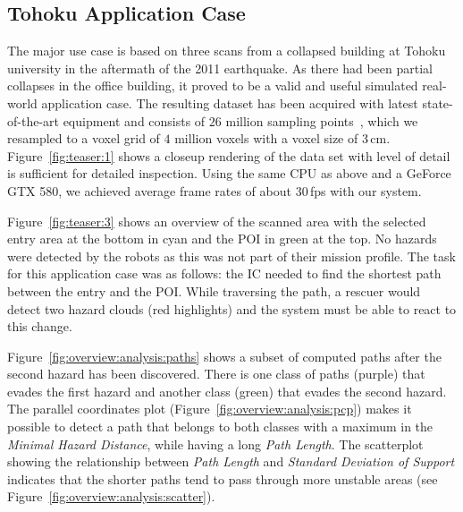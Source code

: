 \documentclass{egpubl}
\begin{document}
\subsection{Tohoku Application Case} \label{sec:results:applicationcase}

The major use case is based on three scans from a collapsed building at Tohoku university in the aftermath of the 2011 earthquake. As there had been partial collapses in the office building, it proved to be a valid and useful simulated real-world application case. The resulting dataset has been acquired with latest state-of-the-art equipment and consists of $26$ million sampling points~\cite{journals/jfr/NagataniKOOYTNYKFK13}, which we resampled to a voxel grid of $4$ million voxels with a voxel size of 3\,cm. Figure~\ref{fig:teaser:1} shows a closeup rendering of the data set with level of detail is sufficient for detailed inspection. Using the same CPU as above and a GeForce GTX 580, we achieved average frame rates of about 30\,fps with our system.

Figure~\ref{fig:teaser:3} shows an overview of the scanned area with the selected entry area at the bottom in cyan and the POI in green at the top. No hazards were detected by the robots as this was not part of their mission profile. The task for this application case was as follows: the IC needed to find the shortest path between the entry and the POI. While traversing the path, a rescuer would detect two hazard clouds (red highlights) and the system must be able to react to this change.

Figure~\ref{fig:overview:analysis:paths} shows a subset of computed paths after the second hazard has been discovered. There is one class of paths (purple) that evades the first hazard and another class (green) that evades the second hazard. The parallel coordinates plot (Figure~\ref{fig:overview:analysis:pcp}) makes it possible to detect a path that belongs to both classes with a maximum in the \emph{Minimal Hazard Distance}, while having a long \emph{Path Length}. The scatterplot showing the relationship between \emph{Path Length} and \emph{Standard Deviation of Support} indicates that the shorter paths tend to pass through more unstable areas (see Figure~\ref{fig:overview:analysis:scatter}).
\end{document}
